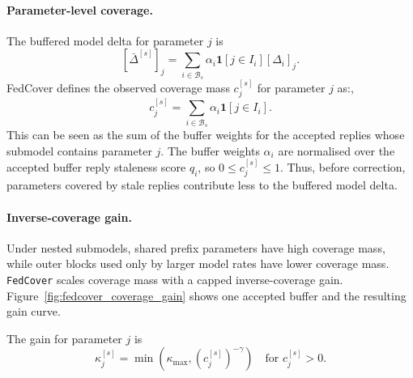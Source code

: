 \paragraph{Parameter-level coverage.}
The buffered model delta for parameter \(j\) is
\[
    [\bar{\Delta}^{[s]}]_j
    =
    \sum_{i \in \mathcal{B}_s}
    \alpha_i \mathbf{1}[j \in I_i][\Delta_i]_j.
\]
FedCover defines the observed coverage mass \(c_j^{[s]}\) for parameter \(j\) as:,
\[
    c_j^{[s]} =
    \sum_{i \in \mathcal{B}_s}
    \alpha_i \mathbf{1}[j \in I_i].
\]
This can be seen as the sum of the buffer weights for the accepted replies whose submodel contains parameter \(j\). The buffer weights \(\alpha_i\) are normalised over the accepted buffer reply staleness score \(q_i\), so \(0 \le c_j^{[s]} \le 1\). Thus, before correction, parameters covered by stale replies contribute less to the buffered model delta.

\paragraph{Inverse-coverage gain.}
Under nested submodels, shared prefix parameters have high coverage mass, while outer blocks used only by larger model rates have lower coverage mass. 
\texttt{FedCover} scales coverage mass with a capped inverse-coverage gain. Figure~\ref{fig:fedcover_coverage_gain} shows one accepted buffer and the resulting gain curve.

The gain for parameter \(j\) is
\[
    \kappa_j^{[s]}
    =
    \min\!\left(\kappa_{\max}, (c_j^{[s]})^{-\gamma}\right)
    \quad \text{for } c_j^{[s]} > 0.
\]

